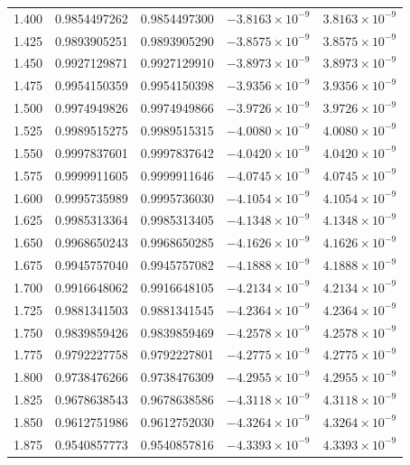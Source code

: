 \documentclass[11pt,a4paper]{article}
\begin{document}
\begin{longtable}{rrrrr}
1.400 & 0.9854497262 & 0.9854497300 & $-3.8163\times 10^{-9}$ & $3.8163\times 10^{-9}$ \\
1.425 & 0.9893905251 & 0.9893905290 & $-3.8575\times 10^{-9}$ & $3.8575\times 10^{-9}$ \\
1.450 & 0.9927129871 & 0.9927129910 & $-3.8973\times 10^{-9}$ & $3.8973\times 10^{-9}$ \\
1.475 & 0.9954150359 & 0.9954150398 & $-3.9356\times 10^{-9}$ & $3.9356\times 10^{-9}$ \\
1.500 & 0.9974949826 & 0.9974949866 & $-3.9726\times 10^{-9}$ & $3.9726\times 10^{-9}$ \\
1.525 & 0.9989515275 & 0.9989515315 & $-4.0080\times 10^{-9}$ & $4.0080\times 10^{-9}$ \\
1.550 & 0.9997837601 & 0.9997837642 & $-4.0420\times 10^{-9}$ & $4.0420\times 10^{-9}$ \\
1.575 & 0.9999911605 & 0.9999911646 & $-4.0745\times 10^{-9}$ & $4.0745\times 10^{-9}$ \\
1.600 & 0.9995735989 & 0.9995736030 & $-4.1054\times 10^{-9}$ & $4.1054\times 10^{-9}$ \\
1.625 & 0.9985313364 & 0.9985313405 & $-4.1348\times 10^{-9}$ & $4.1348\times 10^{-9}$ \\
1.650 & 0.9968650243 & 0.9968650285 & $-4.1626\times 10^{-9}$ & $4.1626\times 10^{-9}$ \\
1.675 & 0.9945757040 & 0.9945757082 & $-4.1888\times 10^{-9}$ & $4.1888\times 10^{-9}$ \\
1.700 & 0.9916648062 & 0.9916648105 & $-4.2134\times 10^{-9}$ & $4.2134\times 10^{-9}$ \\
1.725 & 0.9881341503 & 0.9881341545 & $-4.2364\times 10^{-9}$ & $4.2364\times 10^{-9}$ \\
1.750 & 0.9839859426 & 0.9839859469 & $-4.2578\times 10^{-9}$ & $4.2578\times 10^{-9}$ \\
1.775 & 0.9792227758 & 0.9792227801 & $-4.2775\times 10^{-9}$ & $4.2775\times 10^{-9}$ \\
1.800 & 0.9738476266 & 0.9738476309 & $-4.2955\times 10^{-9}$ & $4.2955\times 10^{-9}$ \\
1.825 & 0.9678638543 & 0.9678638586 & $-4.3118\times 10^{-9}$ & $4.3118\times 10^{-9}$ \\
1.850 & 0.9612751986 & 0.9612752030 & $-4.3264\times 10^{-9}$ & $4.3264\times 10^{-9}$ \\
1.875 & 0.9540857773 & 0.9540857816 & $-4.3393\times 10^{-9}$ & $4.3393\times 10^{-9}$ \\

\end{longtable}
\end{document}
